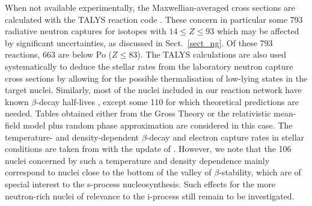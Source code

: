 \documentclass{aa}
\begin{document}
When not available experimentally, the Maxwellian-averaged cross sections are calculated with the {\sf TALYS} reaction code \citep{Koning12,Goriely08a}. These concern in particular some 793 radiative neutron captures for isotopes with $14 \le Z \le 93$ which may be affected by significant uncertainties, as discussed in Sect.~\ref{sect_ng}. Of these 793 reactions, 663 are below Po ($Z\le 83$). The {\sf TALYS} calculations are also used systematically to deduce the stellar rates   from the laboratory neutron capture cross sections by
allowing for the possible thermalisation of low-lying states in the target nuclei. Similarly, most of the nuclei included in our reaction network have known $\beta$-decay half-lives \citep{Audi17a}, except some 110 for which theoretical predictions are needed. Tables obtained either from the Gross Theory \citep{Tachibana90} or the relativistic mean-field model plus random phase approximation \citep{Marketin16} are considered in this case. The temperature- and density-dependent $\beta$-decay and electron capture rates in stellar conditions are taken from \citet{Takahashi87} with the update of  \citet{Goriely99}. However, we note that the 106 nuclei concerned by such a temperature and density dependence mainly correspond to nuclei close to the bottom of the valley of $\beta$-stability, which are of special interest to the s-process nucleosynthesis. Such effects for the more neutron-rich nuclei of relevance to the i-process still remain to be investigated.
\end{document}
